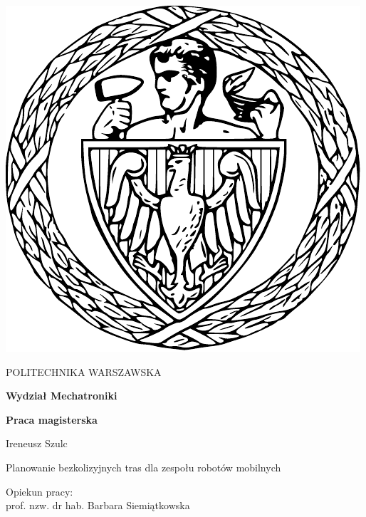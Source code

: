 
\thispagestyle {empty}

\begin{center}
	\includegraphics[scale=0.4]{img/pw}
	
	\vspace{0.5cm}
	
	{\fontsize{20}{20}\selectfont POLITECHNIKA WARSZAWSKA}
	
	\vspace{1.0cm}
	
	\textbf{{\fontsize{14}{14}\selectfont Wydział Mechatroniki}}
	
	\vspace{1.5cm}
	
	\textbf{{\fontsize{14}{14}\selectfont Praca magisterska}}

	\vspace{2.0cm}
	
	{\fontsize{14}{14}\selectfont Ireneusz Szulc}
	
	\vspace{1cm}
	
	{\fontsize{28}{28}\selectfont Planowanie bezkolizyjnych tras dla zespołu robotów mobilnych}
	
	\vspace{1cm}
	\begin{flushright}
		{\fontsize{14}{14}\selectfont Opiekun pracy: \\ 
		prof. nzw. dr hab. Barbara Siemiątkowska
		}
	

\end{flushright}
\end{center}
